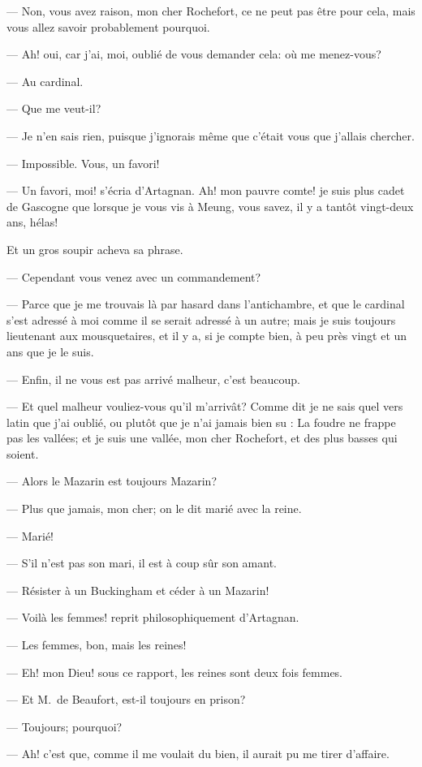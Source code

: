 — Non, vous avez raison, mon cher Rochefort, ce ne peut pas être pour cela, mais vous allez savoir probablement pourquoi.

— Ah! oui, car j'ai, moi, oublié de vous demander cela: où me menez-vous?

— Au cardinal.

— Que me veut-il?

— Je n'en sais rien, puisque j'ignorais même que c'était vous que j'allais chercher.

— Impossible. Vous, un favori!

— Un favori, moi! s'écria d'Artagnan. Ah! mon pauvre comte! je suis plus cadet de Gascogne que lorsque je vous vis à Meung, vous savez, il y a tantôt vingt-deux ans, hélas!

Et un gros soupir acheva sa phrase.

— Cependant vous venez avec un commandement?

— Parce que je me trouvais là par hasard dans l'antichambre, et que le cardinal s'est adressé à moi comme il se serait adressé à un autre; mais je suis toujours lieutenant aux mousquetaires, et il y a, si je compte bien, à peu près vingt et un ans que je le suis.

— Enfin, il ne vous est pas arrivé malheur, c'est beaucoup.

— Et quel malheur vouliez-vous qu'il m'arrivât? Comme dit je ne sais quel vers latin que j'ai oublié, ou plutôt que je n'ai jamais bien su : La foudre ne frappe pas les vallées; et je suis une vallée, mon cher Rochefort, et des plus basses qui soient.

— Alors le Mazarin est toujours Mazarin?

— Plus que jamais, mon cher; on le dit marié avec la reine.

— Marié!

— S'il n'est pas son mari, il est à coup sûr son amant.

— Résister à un Buckingham et céder à un Mazarin!

— Voilà les femmes! reprit philosophiquement d'Artagnan.

— Les femmes, bon, mais les reines!

— Eh! mon Dieu! sous ce rapport, les reines sont deux fois femmes.

— Et M.~de Beaufort, est-il toujours en prison?

— Toujours; pourquoi?

— Ah! c'est que, comme il me voulait du bien, il aurait pu me tirer d'affaire.

